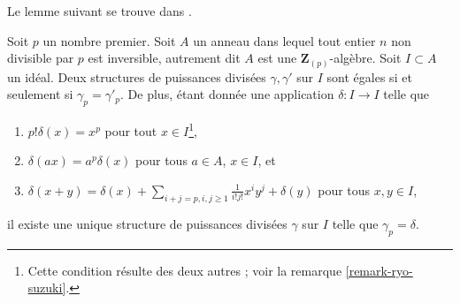 \noindent
Le lemme suivant se trouve dans \cite{BO}.

\begin{lemma}
\label{lemma-need-only-gamma-p}
Soit $p$ un nombre premier. Soit $A$ un anneau dans lequel tout entier $n$
non divisible par $p$ est inversible, autrement dit $A$ est une $\mathbf{Z}_{(p)}$-algèbre.
Soit $I \subset A$ un idéal. Deux structures de puissances divisées
$\gamma, \gamma'$ sur $I$ sont égales si et seulement si $\gamma_p = \gamma'_p$.
De plus, étant donnée une application $\delta : I \to I$ telle que
\begin{enumerate}
\item $p!\delta(x) = x^p$ pour tout $x \in I$\footnote{Cette condition
résulte des deux autres ; voir la remarque \ref{remark-ryo-suzuki}.},
\item $\delta(ax) = a^p\delta(x)$ pour tous $a \in A$, $x \in I$, et
\item
$\delta(x + y) =
\delta(x) +
\sum\nolimits_{i + j = p, i,j \geq 1} \frac{1}{i!j!} x^i y^j +
\delta(y) $ pour tous $ x, y \in I$,
\end{enumerate}
il existe une unique structure de puissances divisées $\gamma$ sur $I$ telle
que $\gamma_p = \delta$.
\end{lemma}

